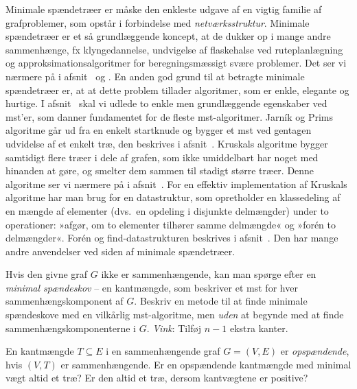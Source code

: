 %
Minimale spændetræer er måske den enkleste udgave af en vigtig familie af grafproblemer, som opstår i forbindelse med \emph{netværksstruktur}.
Minimale spændetræer er et så grundlæggende koncept, at de dukker op i mange andre sammenhænge,
fx klyngedannelse,
undvigelse af flaskehalse ved ruteplanlægning
og approksimationsalgoritmer for beregningsmæssigt svære problemer.
Det ser vi nærmere på i afsnit~ og .
En anden god grund til at betragte  minimale spændetræer er, at at dette problem tillader algoritmer, som er enkle, elegante og hurtige.
I afsnit~ skal vi udlede to enkle men grundlæggende egenskaber ved mst’er, som danner fundamentet for de fleste mst-algoritmer. 
Jarník og Prims algoritme går ud fra en enkelt startknude og bygger et mst ved gentagen udvidelse af et enkelt træ, den beskrives i afsnit~.
Kruskals algoritme bygger samtidigt flere træer i dele af grafen, som ikke umiddelbart har noget med hinanden at gøre, og smelter dem sammen til stadigt større træer.
Denne algoritme ser vi nærmere på  i afsnit~.
For en effektiv implementation af Kruskals algoritme har man brug for en datastruktur, som opretholder en klassedeling af en mængde af elementer (dvs.\ en opdeling i disjunkte delmængder) under to operationer:
»afgør, om to elementer tilhører samme delmængde« og »forén to delmængder«.
Forén og find-datastrukturen beskrives i afsnit~.
Den har mange andre anvendelser ved siden af minimale spændetræer.

\begin{exerc}
  Hvis den givne graf $G$ ikke er sammenhængende, kan man spørge efter en 
  \emph{minimal spændeskov} -- en kantmængde, som beskriver et mst for hver sammenhængskomponent af $G$.
  Beskriv en metode til at finde minimale spændeskove med en vilkårlig mst-algoritme, men \emph{uden} at begynde med at finde sammenhængskomponenterne i $G$.
  \emph{Vink}: Tilføj $n-1$ ekstra kanter.
\end{exerc}

\begin{exerc} 
  En kantmængde $T\subseteq E$ i en sammenhængende graf $G=(V,E)$ er \emph{opspændende}, hvis $(V,T)$ er sammenhængende. 
  Er en opspændende kantmængde med minimal vægt altid et træ?
  Er den altid et træ, dersom kantvægtene er positive?
\end{exerc}


